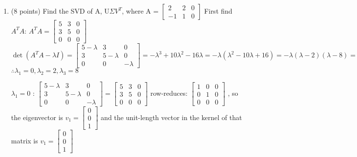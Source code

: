 \documentclass{article} %
\begin{document}
\begin{flushleft}
\begin{enumerate}
            \bigbreak
            \bigbreak
            \item (8 points) Find the SVD of A, U$\Sigma V^{T}$, where A = $\begin{bmatrix} 2 & 2 & 0 \\ -1 & 1 & 0  \end{bmatrix}$
            \break
            \text First find $A^{T}A$: $A^{T}A = \begin{bmatrix} 5 & 3 & 0 \\ 3 & 5 & 0 \\ 0 & 0 & 0\end{bmatrix}$
            \break $\det (A^{T}A - \lambda I) = \begin{bmatrix}
                5-\lambda & 3 & 0 \\ 3 & 5 - \lambda & 0 \\ 0 & 0 & -\lambda
            \end{bmatrix} = -\lambda ^{3} + 10\lambda^{2} - 16\lambda = -\lambda(\lambda^{2} - 10\lambda + 16) = -\lambda(\lambda-2)(\lambda-8)=0$
            \(\therefore \lambda_{1} = 0, \lambda_{2} = 2, \lambda_{3} = 8\)
            \break

            $\lambda_{1} = 0$ :
            \bigbreak
            $\begin{bmatrix}
                5-\lambda & 3 & 0 \\ 3 & 5 - \lambda & 0 \\ 0 & 0 & -\lambda
            \end{bmatrix} = \begin{bmatrix}
                5 & 3 & 0 \\ 3 & 5 & 0 \\ 0 & 0 & 0
            \end{bmatrix}$
            \break \text row-reduces: $\begin{bmatrix}
                1 & 0 & 0 \\ 0 & 1 & 0 \\ 0 & 0 & 0
            \end{bmatrix}$ , so the eigenvector is $\mathit{v}_{1} = \begin{bmatrix}
                0 \\ 0 \\ 1
            \end{bmatrix}$ and the unit-length vector in the kernel of that matrix is $\mathit{v}_{1} = \begin{bmatrix}
                0 \\ 0 \\ 1
            \end{bmatrix}$


\end{enumerate}
\end{flushleft}
\end{document}

